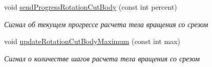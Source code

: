 \begin{DoxyCompactItemize}
$$void \mbox{\hyperlink{class_solver_a3483160c5bbf4723167a508b73f8f65a}{send\+Progress\+Rotation\+Cut\+Body}} (const int percent)
\begin{DoxyCompactList}\small\item\em Сигнал об текущем прогрессе расчета тела вращения со срезом \end{DoxyCompactList}\item 
\mbox{\label{class_solver_a89c79ac1ef46ac2fc758032525c40176}} 
void \mbox{\hyperlink{class_solver_a89c79ac1ef46ac2fc758032525c40176}{update\+Rotation\+Cut\+Body\+Maximum}} (const int max)
\begin{DoxyCompactList}\small\item\em Сигнал о количестве шагов расчета тела вращения со срезом \end{DoxyCompactList}\end{DoxyCompactItemize}
